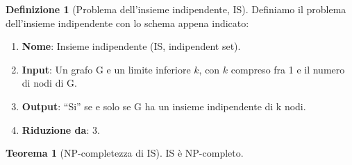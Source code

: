 \documentclass[12pt]{article}
\theoremstyle{definition}
\newtheorem*{mydef}{Definizione}
\newtheorem*{mytheo}{Teorema}
\begin{document}
\begin{mydef}[Problema dell'insieme indipendente, IS]
  Definiamo il problema dell'insieme indipendente con lo schema appena indicato: 

  \begin{enumerate}
  \item \textbf{Nome}: Insieme indipendente (IS, indipendent set).
  \item \textbf{Input}: Un grafo G e un limite inferiore \(k\), con \(k\) compreso
    fra 1 e il numero di nodi di G.
  \item \textbf{Output}: ``Si'' se e solo se G ha un insieme indipendente di k nodi.
  \item \textbf{Riduzione da}: 3\SAT.
  \end{enumerate}

\end{mydef}

\begin{mytheo}[NP-completezza di IS]
  IS \`e NP-completo.
\end{mytheo}
\end{document}
